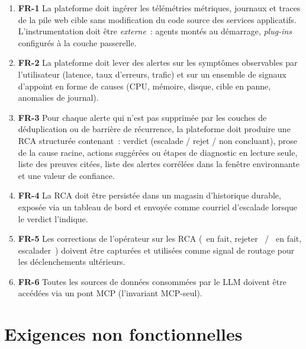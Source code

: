 \documentclass[11pt,a4paper,oneside]{report}
\begin{document}
\begin{enumerate}
  \item \textbf{FR-1} La plateforme doit ingérer les télémétries
        métriques, journaux et traces de la pile web cible sans
        modification du code source des services applicatifs.
        L'instrumentation doit être \emph{externe}~: agents montés
        au démarrage, \emph{plug-ins} configurés à la couche
        passerelle.
  \item \textbf{FR-2} La plateforme doit lever des alertes sur les
        symptômes observables par l'utilisateur (latence, taux
        d'erreurs, trafic) et sur un ensemble de signaux d'appoint
        en forme de causes (CPU, mémoire, disque, cible en panne,
        anomalies de journal).
  \item \textbf{FR-3} Pour chaque alerte qui n'est pas supprimée
        par les couches de déduplication ou de barrière de
        récurrence, la plateforme doit produire une RCA structurée
        contenant~: verdict (escalade / rejet / non concluant),
        prose de la cause racine, actions suggérées ou étapes de
        diagnostic en lecture seule, liste des preuves citées,
        liste des alertes corrélées dans la fenêtre environnante et
        une valeur de confiance.
  \item \textbf{FR-4} La RCA doit être persistée dans un magasin
        d'historique durable, exposée via un tableau de bord et
        envoyée comme courriel d'escalade lorsque le verdict
        l'indique.
  \item \textbf{FR-5} Les corrections de l'opérateur sur les RCA
        (\og~en fait, rejeter~\fg{} / \og~en fait, escalader~\fg{})
        doivent être capturées et utilisées comme signal de routage
        pour les déclenchements ultérieurs.
  \item \textbf{FR-6} Toutes les sources de données consommées par
        le LLM doivent être accédées via un pont MCP (l'invariant
        MCP-seul).
\end{enumerate}

\section{Exigences non fonctionnelles}
\end{document}
